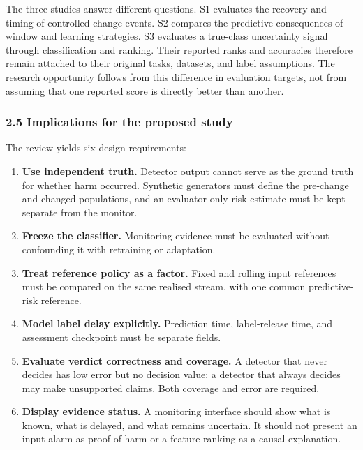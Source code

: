\documentclass[
]{article}
\providecommand{\tightlist}{%
  \setlength{\itemsep}{0pt}\setlength{\parskip}{0pt}}
\begin{document}
The three studies answer different questions. S1 evaluates the recovery
and timing of controlled change events. S2 compares the predictive
consequences of window and learning strategies. S3 evaluates a
true-class uncertainty signal through classification and ranking. Their
reported ranks and accuracies therefore remain attached to their
original tasks, datasets, and label assumptions. The research
opportunity follows from this difference in evaluation targets, not from
assuming that one reported score is directly better than another.

\hypertarget{implications-for-the-proposed-study}{%
\subsubsection{2.5 Implications for the proposed
study}\label{implications-for-the-proposed-study}}

The review yields six design requirements:

\begin{enumerate}
\def\labelenumi{\arabic{enumi}.}
\tightlist
\item
  \textbf{Use independent truth.} Detector output cannot serve as the
  ground truth for whether harm occurred. Synthetic generators must
  define the pre-change and changed populations, and an evaluator-only
  risk estimate must be kept separate from the monitor.
\item
  \textbf{Freeze the classifier.} Monitoring evidence must be evaluated
  without confounding it with retraining or adaptation.
\item
  \textbf{Treat reference policy as a factor.} Fixed and rolling input
  references must be compared on the same realised stream, with one
  common predictive-risk reference.
\item
  \textbf{Model label delay explicitly.} Prediction time, label-release
  time, and assessment checkpoint must be separate fields.
\item
  \textbf{Evaluate verdict correctness and coverage.} A detector that
  never decides has low error but no decision value; a detector that
  always decides may make unsupported claims. Both coverage and error
  are required.
\item
  \textbf{Display evidence status.} A monitoring interface should show
  what is known, what is delayed, and what remains uncertain. It should
  not present an input alarm as proof of harm or a feature ranking as a
  causal explanation.
\end{enumerate}
\end{document}
